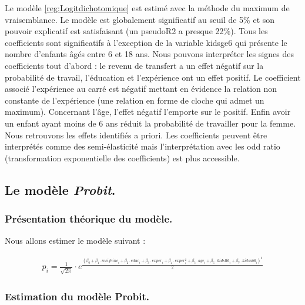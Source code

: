 Le modèle \ref{reg:Logitdichotomique} est estimé avec la méthode du maximum de vraisemblance. Le modèle est globalement significatif au seuil de 5\% et son pouvoir explicatif est satisfaisant (un pseudoR2 a presque 22\%). Tous les coefficients sont significatifs à l’exception de la variable kidsge6 qui présente le nombre d’enfants âgés entre 6 et 18 ans. Nous pouvons interpréter les signes des coefficients tout d’abord : le revenu de transfert a un effet négatif sur la probabilité de travail, l’éducation et l’expérience ont un effet positif. Le coefficient associé l’expérience au carré est négatif mettant en évidence la relation non constante de l’expérience (une relation en forme de cloche qui admet un maximum). Concernant l’âge, l’effet négatif l’emporte sur le positif. Enfin avoir un enfant ayant moins de 6 ans réduit la probabilité de travailler pour la femme. Nous retrouvons les effets identifiés a priori. Les coefficients peuvent être interprétés comme des semi-élasticité mais l’interprétation avec les odd ratio (transformation exponentielle des coefficients) est plus accessible. 


\subsection*{Le modèle \emph{Probit}.}

\subsubsection*{Présentation théorique du modèle.}

Nous allons estimer le modèle suivant : 

\begin{align*}
    p_i = \frac{1}{\sqrt{2\pi}} \cdot e^{\frac{(\beta_0 + \beta_1 \cdot nwifeinc_i + \beta_2 \cdot educ_i + \beta_3 \cdot exper_i + \beta_4 \cdot exper_i^2 + \beta_5 \cdot age_i + \beta_6 \cdot kidslt6_i + \beta_7 \cdot kidsab6_i)^2}{2}}
 \end{align*}

 \subsubsection*{Estimation du modèle Probit.}

